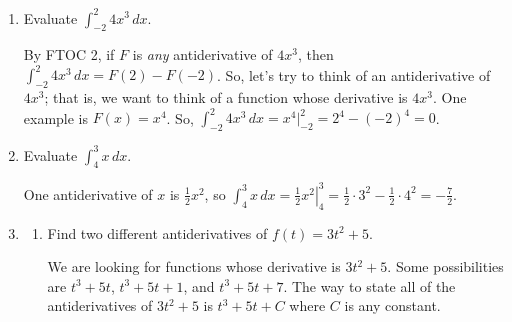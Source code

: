 \documentclass[main]{subfiles}
\begin{document}
\begin{enumerate}[resume]
\item 

  \begin{problem}[\stretch{0.5}]
    Evaluate $\displaystyle \int_{-2}^2 4x^3\,dx$.
  \end{problem}

  \begin{solution}
    By FTOC 2, if $F$ is \emph{any} antiderivative of $4x^3$, then
    $\displaystyle \int_{-2}^2 4x^3\,dx = F(2) - F(-2)$.  So, let's try to
    think of an antiderivative of $4x^3$; that is, we want to think of a
    function whose derivative is $4x^3$.  One example is $F(x) = x^4$.
    So, $\displaystyle \int_{-2}^2 4x^3\,dx = x^4 \Big|_{-2}^2 = 2^4 -
    (-2)^4 = \boxed{0}$.
  \end{solution}

\item 

  \begin{problem}[\stretch{0.5}]
    Evaluate $\displaystyle \int_4^3 x\,dx$.
  \end{problem}

  \begin{solution}
    One antiderivative of $x$ is $\frac{1}{2} x^2$, so $\displaystyle
    \int_4^3 x\,dx = \left. \frac{1}{2} x^2 \right|_4^3 = \frac{1}{2}
    \cdot 3^2 - \frac{1}{2} \cdot 4^2 = \boxed{-\frac{7}{2}}$.
  \end{solution}

\item 
  \begin{enumerate}
  \item
    \begin{problem}[\stretch{0.5}]
      Find two different antiderivatives of $f(t)=3t^2+5$.
    \end{problem}

    \begin{solution}
      We are looking for functions whose derivative is $3t^2 + 5$.  Some
      possibilities are $t^3 + 5t$, $t^3 + 5t + 1$, and $t^3 + 5t + 7$.  The way to state all of the antiderivatives of $3t^2 + 5$ is $t^3 + 5t + C$
      where $C$ is any constant.
    \end{solution}


\end{enumerate}
\end{enumerate}
\end{document}
